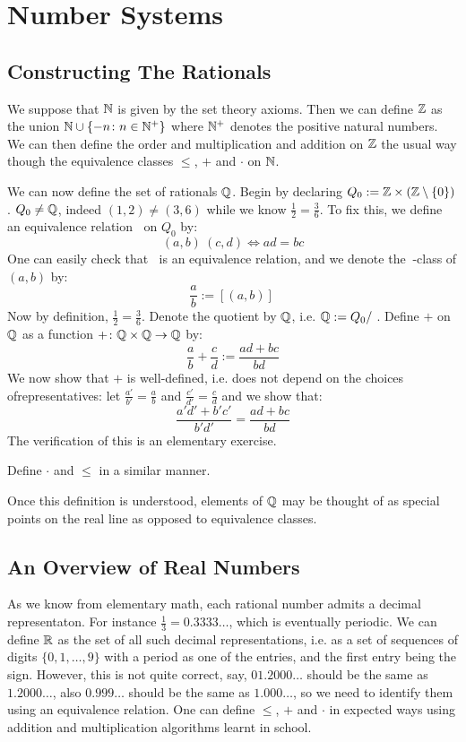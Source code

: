 \section{Number Systems}

\subsection{Constructing The Rationals}

We suppose that $\mathbb{N}$ is given by the set theory axioms. Then we can define $\mathbb{Z}$ as the union $\mathbb{N} \cup \{-n \colon n \in \mathbb{N}^+\}$ where $\mathbb{N}^+$ denotes the positive natural numbers. We can then define the order and multiplication and addition on $\mathbb{Z}$ the usual way though the equivalence classes $\leq$, $+$ and $\cdot$ on $\mathbb{N}$.

We can now define the set of rationals $\mathbb{Q}$. Begin by declaring $Q_0 := \mathbb{Z} \times (\mathbb{Z} \setminus \{0\})$. $Q_0 \neq \mathbb{Q}$, indeed $(1, 2) \neq (3, 6)$ while we know $\frac{1}{2} = \frac{3}{6}$. To fix this, we define an equivalence relation $~$ on $Q_0$ by:
   \[ (a, b) ~ (c,d) \iff ad = bc \]
One can easily check that $~$ is an equivalence relation, and we denote the $~$-class of $(a,b)$ by:
   \[ \frac{a}{b} := [(a,b)]_{~} \]
Now by definition, $\frac{1}{2} = \frac{3}{6}$. Denote the quotient by $\mathbb{Q}$, i.e. $\mathbb{Q} := Q_0/~$. Define $+$ on $\mathbb{Q}$ as a function $+ \colon \mathbb{Q} \times \mathbb{Q} \to \mathbb{Q}$ by:
   \[ \frac{a}{b} + \frac{c}{d} := \frac{ad + bc}{bd} \]
We now show that $+$ is well-defined, i.e. does not depend on the choices ofrepresentatives: let $\frac{a'}{b'} = \frac{a}{b}$ and $\frac{c'}{d'} = \frac{c}{d}$ and we show that:
   \[ \frac{a'd' + b'c'}{b'd'} = \frac{ad + bc}{bd} \]
   The verification of this is an elementary exercise.

   Define $\cdot$ and $\leq$ in a similar manner. 

   \begin{remark}
      Once this definition is understood, elements of $\mathbb{Q}$ may be thought of as special points on the real line as opposed to equivalence classes.
   \end{remark}

\subsection{An Overview of Real Numbers}

   As we know from elementary math, each rational number admits a decimal representaton. For instance $\frac{1}{3} = 0.3333\dots$, which is eventually periodic. We can define $\mathbb{R}$ as the set of all such decimal representations, i.e. as a set of sequences of digits $\{0, 1, \dots, 9\}$ with a period as one of the entries, and the first entry being the sign. However, this is not quite correct, say, $01.2000\dots$ should be the same as $1.2000\dots$, also $0.999\dots$ should be the same as $1.000\dots$, so we need to identify them using an equivalence relation. One can define $\leq$, $+$ and $\cdot$ in expected ways using addition and multiplication algorithms learnt in school. 

